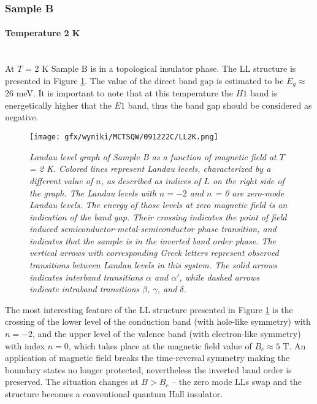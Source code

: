 \documentclass[titlepage,a4paper]{book}
\newcommand{\wciecie}{\quad\phantom{v}}
\newcommand{\myparagraph}[1]{\paragraph{#1}\mbox{}\\}
\begin{document}
\clearpage
\subsubsection{Sample B}
\myparagraph{Temperature 2 K}
\wciecie
At $T$ = 2 K Sample B is in a topological insulator phase. The LL structure is presented in Figure \ref{fig:LL_SQW_2K}. The value of the direct band gap is estimated to be $E_g \approx $ 26 meV. It is important to note that at this temperature the $H1$ band is energetically higher that the $E1$ band, thus the band gap should be considered as negative.

\begin{figure}[ht]
	\centering
	\texttt{[image: gfx/wyniki/MCTSQW/091222C/LL2K.png]}
	\vspace{-10pt}
	\caption{\textit{Landau level graph of Sample B as a function of magnetic field at $T$ = 2 K. Colored lines represent Landau levels, characterized by a different value of $n$, as described as indices of $L$ on the right side of the graph. The Landau levels with $n = -2$ and $n$ = 0 are zero-mode Landau levels. The energy of those levels at zero magnetic field is an indication of the band gap. Their crossing indicates the point of field induced semiconductor-metal-semiconductor phase transition, and indicates that the sample is in the inverted band order phase. The vertical arrows with corresponding Greek letters represent observed transitions between Landau levels in this system. The solid arrows indicates interband transitions $\alpha$ and $\alpha'$, while dashed arrows indicate intraband transitions $\beta$, $\gamma$, and $\delta$.}}
	\label{fig:LL_SQW_2K}
\end{figure}

The most interesting feature of the LL structure presented in Figure \ref{fig:LL_SQW_2K} is the crossing of the lower level of the conduction band (with hole-like symmetry) with $n = -2$, and the upper level of the valence band (with electron-like symmetry) with index $n = 0$, which takes place at the magnetic field value of $B_c \approx 5$ T. An application of magnetic field breaks the time-reversal symmetry making the boundary states no longer protected, nevertheless the inverted band order is preserved. The situation changes at $B > B_c$ -- the zero mode LLs swap and the structure becomes a conventional quantum Hall insulator. 
 
\end{document}
